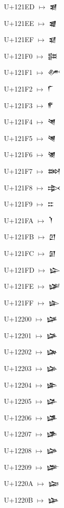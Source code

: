 {\noindent U+121ED  $\mapsto$ {\cufont 𒇭}\par
\noindent U+121EE  $\mapsto$ {\cufont 𒇮}\par
\noindent U+121EF  $\mapsto$ {\cufont 𒇯}\par
\noindent U+121F0  $\mapsto$ {\cufont 𒇰}\par
\noindent U+121F1  $\mapsto$ {\cufont 𒇱}\par
\noindent U+121F2  $\mapsto$ {\cufont 𒇲}\par
\noindent U+121F3  $\mapsto$ {\cufont 𒇳}\par
\noindent U+121F4  $\mapsto$ {\cufont 𒇴}\par
\noindent U+121F5  $\mapsto$ {\cufont 𒇵}\par
\noindent U+121F6  $\mapsto$ {\cufont 𒇶}\par
\noindent U+121F7  $\mapsto$ {\cufont 𒇷}\par
\noindent U+121F8  $\mapsto$ {\cufont 𒇸}\par
\noindent U+121F9  $\mapsto$ {\cufont 𒇹}\par
\noindent U+121FA  $\mapsto$ {\cufont 𒇺}\par
\noindent U+121FB  $\mapsto$ {\cufont 𒇻}\par
\noindent U+121FC  $\mapsto$ {\cufont 𒇼}\par
\noindent U+121FD  $\mapsto$ {\cufont 𒇽}\par
\noindent U+121FE  $\mapsto$ {\cufont 𒇾}\par
\noindent U+121FF  $\mapsto$ {\cufont 𒇿}\par
\noindent U+12200  $\mapsto$ {\cufont 𒈀}\par
\noindent U+12201  $\mapsto$ {\cufont 𒈁}\par
\noindent U+12202  $\mapsto$ {\cufont 𒈂}\par
\noindent U+12203  $\mapsto$ {\cufont 𒈃}\par
\noindent U+12204  $\mapsto$ {\cufont 𒈄}\par
\noindent U+12205  $\mapsto$ {\cufont 𒈅}\par
\noindent U+12206  $\mapsto$ {\cufont 𒈆}\par
\noindent U+12207  $\mapsto$ {\cufont 𒈇}\par
\noindent U+12208  $\mapsto$ {\cufont 𒈈}\par
\noindent U+12209  $\mapsto$ {\cufont 𒈉}\par
\noindent U+1220A  $\mapsto$ {\cufont 𒈊}\par
\noindent U+1220B  $\mapsto$ {\cufont 𒈋}\par
}
